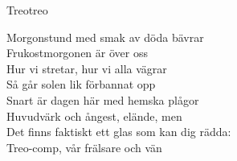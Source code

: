 \begin{song}{Treo}{treo}
\begin{vers}
Morgonstund med smak av döda bävrar\\
Frukostmorgonen är över oss\\
Hur vi stretar, hur vi alla vägrar\\
Så går solen lik förbannat opp\\
Snart är dagen här med hemska plågor\\
Huvudvärk och ångest, elände, men\\
Det finns faktiskt ett glas som kan dig rädda:\\
Treo-comp, vår frälsare och vän\\
\end{vers}
\end{song}
